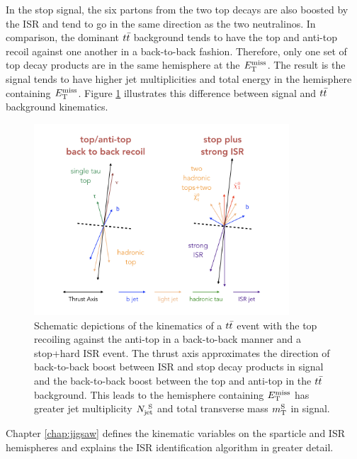 \indent In the stop signal, the six partons from the two top decays are also boosted by the ISR and tend to go in the same direction as the two neutralinos.  In comparison, the dominant $\ttbar$ background tends to have the top and anti-top recoil against one another in a back-to-back fashion.  Therefore, only one set of top decay products are in the same hemisphere at the $E_{\mathrm{T}}^{\mathrm{miss}}$.  The result is the signal tends to have higher jet multiplicities and total energy in the hemisphere containing $E_{\mathrm{T}}^{\mathrm{miss}}$.  Figure \ref{fig:ISR:ttbarb2b_sig} illustrates this difference between signal and $\ttbar$ background kinematics.  \\

\begin{figure}[h!]
  \centering
	\includegraphics[width=0.85\textwidth]{./figures/strategy/ttbarb2b_stop.png}
	\caption[Schematic depictions of the kinematics of a $\ttbar$ event with the top recoiling against the anti-top in a back-to-back manner and a stop+hard ISR event]{Schematic depictions of the kinematics of a $\ttbar$ event with the top recoiling against the anti-top in a back-to-back manner and a stop+hard ISR event.  The thrust axis approximates the direction of back-to-back boost between ISR and stop decay products in signal and the back-to-back boost between the top and anti-top in the $\ttbar$ background.  This leads to the hemisphere containing $E_{\mathrm{T}}^{\mathrm{miss}}$ has greater jet multiplicity $N_{\mathrm{jet}}^{~\mathrm{S}}$ and total transverse mass $m_{\mathrm{T}}^{\mathrm{S}}$ in signal. }
	\label{fig:ISR:ttbarb2b_sig}
\end{figure}

\indent Chapter \ref{chap:jigsaw} defines the kinematic variables on the sparticle and ISR hemispheres and explains the ISR identification algorithm in greater detail. \\

